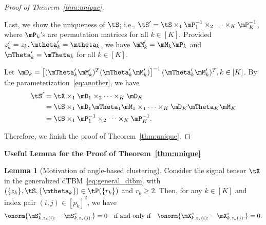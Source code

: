 \documentclass[lettersize,onecolumn,journal]{IEEEtran}
\theoremstyle{definition}
\newtheorem{lem}{Lemma}
\theoremstyle{definition}
\newcommand{\off}[1]{\left[#1\right]}
\begin{document}
\begin{proof}[Proof of Theorem~\ref{thm:unique}]
\begin{enumerate}[wide]
Last, we show the uniqueness of $\tS$; i.e., $\tS'=\tS\times_1 \mP^{-1}_1\times_2\cdots \times_K \mP^{-1}_K$, where $\mP_k$'s are permutation matrices for all $k\in[K]$.  Provided $z'_k = z_k, \mtheta'_k = \mtheta_k$, we have $\mM'_k = \mM_k \mP_k$ and $\mTheta'_k = \mTheta_k$ for all $k \in [K]$. 

Let $\mD_k = \off{ (\mTheta'_k \mM'_k)^T (\mTheta'_k \mM'_k) }^{-1} (\mTheta'_k \mM'_k)^T, k \in [K]$. By the parameterization~\eqref{eq:another}, we have 
\begin{align}
    \tS' &= \tX \times_1 \mD_1 \times_2 \cdots \times_K \mD_K \\
    &= \tS \times_1 \mD_1 \mTheta_1 \mM_1 \times_1 \cdots \times_K \mD_K \mTheta_K \mM_K \\
    &= \tS \times_1 \mP^{-1}_1 \times_2 \cdots \times_K \mP^{-1}_K.
\end{align}


\end{enumerate}

Therefore, we finish the proof of Theorem~\ref{thm:unique}.
\end{proof}


{\bf Useful Lemma for the Proof of Theorem~\ref{thm:unique}} 

\begin{lem}[Motivation of angle-based clustering]\label{lem:angle} Consider the signal tensor $\tX$ in the generalized dTBM~\eqref{eq:general_dtbm} with $(\{z_k\},\tS,\{\mtheta_k\})\in \tP(\{r_k\})$ and $r_k \geq 2$. Then, for any $k \in [K]$ and index pair $(i,j)\in[p_k]^2$, we have 
\begin{equation}
    \onorm{ \mS_{k,z_k(i):}^s -  \mS_{k,z_k(j):}^s } = 0 \quad \text{if and only if} \quad \onorm{  \mX_{k, z_k(i):}^s -  \mX_{k,z_k(j):}^s } = 0.
\end{equation}
\end{lem}
\end{document}
